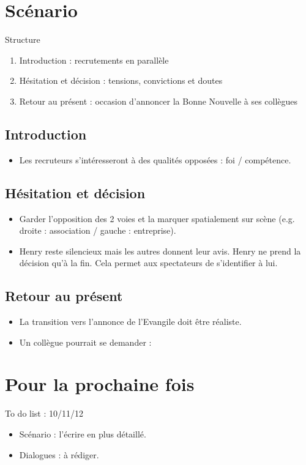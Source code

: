 \documentclass{article}
\begin{document}
\section{Scénario}

    Structure
        \begin{enumerate}
        \item Introduction : recrutements en parallèle
        \item Hésitation et décision : tensions, convictions et doutes
        \item Retour au présent : occasion d'annoncer la Bonne Nouvelle
        à ses collègues
        \end{enumerate}

    \subsection{Introduction}
    
        \begin{itemize}
        \item Les recruteurs s'intéresseront à des qualités opposées :
        foi / compétence.
        \end{itemize}
    
    \subsection{Hésitation et décision}    
    
        \begin{itemize}
        \item Garder l'opposition des 2 voies et la marquer
        spatialement sur scène (e.g. droite : association / 
        gauche : entreprise).
        \item Henry reste silencieux mais les autres donnent leur
        avis. Henry ne prend la décision qu'à la fin. Cela permet
        aux spectateurs de s'identifier à lui.
        \end{itemize}
    
    \subsection{Retour au présent}
    
        \begin{itemize}
        \item La transition vers l'annonce de l'Evangile doit être
        réaliste.
        \item Un collègue pourrait se demander :
        \end{itemize}    
    
\section{Pour la prochaine fois}

    To do list : 10/11/12
        \begin{itemize}
        \item Scénario : l'écrire en plus détaillé.
        \item Dialogues : à rédiger.
        \end{itemize}
	
\end{document}
